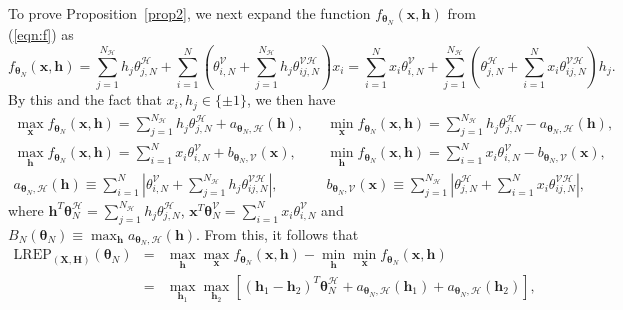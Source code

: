 \documentclass[12pt]{article}
\theoremstyle{definition}
\newcommand{\REP}{\mathrm{LREP}}
\newcommand{\Gam}{B_{N}(\boldsymbol \theta_N) }
\begin{document}
 To prove Proposition~\ref{prop2},
 we next expand the function $f_{\boldsymbol \theta_N} (\boldsymbol x, \boldsymbol h)$  from (\ref{eqn:f}) as
 \[
f_{\boldsymbol \theta_N} (\boldsymbol x, \boldsymbol h)= \sum_{j=1}^{N_\mathcal{H}} h_j \theta_{j,N}^{\mathcal{H}}  +   \sum_{i=1}^N \left( \theta_{i,N}^{\mathcal{V}} + \sum_{j=1}^{N_\mathcal{H}}  h_j  \theta_{ij,N}^{\mathcal{VH}}\right)x_i=\sum_{i=1}^N x_i  \theta_{i,N}^{\mathcal{V}} +  \sum_{j=1}^{N_\mathcal{H}} \left( \theta_{j,N}^{\mathcal{H}}  + \sum_{i=1}^N  x_i  \theta_{ij,N}^{\mathcal{VH}}\right)h_j.\]
By this and the fact that $x_i,h_j\in\{\pm 1\}$, we then have
\begin{eqnarray}
\nonumber \max_{\boldsymbol x}  f_{\boldsymbol \theta_N} (\boldsymbol x, \boldsymbol h) =  \sum_{j=1}^{N_\mathcal{H}} h_j \theta_{j,N}^{\mathcal{H}}  +   a_{\boldsymbol \theta_N, \mathcal{H}} (\boldsymbol h),   &&
 \min_{\boldsymbol x}  f_{\boldsymbol \theta_N} (\boldsymbol x, \boldsymbol h) =  \sum_{j=1}^{N_\mathcal{H}} h_j \theta_{j,N}^{\mathcal{H}}  -   a_{\boldsymbol \theta_N, \mathcal{H}} (\boldsymbol h),\\\nonumber
  \max_{\boldsymbol h}  f_{\boldsymbol \theta_N} (\boldsymbol x, \boldsymbol h) =   \sum_{i=1}^{N}x_i \theta_{i,N}^{\mathcal{V}}  +   b_{\boldsymbol \theta_N, \mathcal{V}} (\boldsymbol x),  &&
 \min_{\boldsymbol h}  f_{\boldsymbol \theta_N} (\boldsymbol x, \boldsymbol h) =  \sum_{i=1}^{N}x_i \theta_{i,N}^{\mathcal{V}}  -   b_{\boldsymbol \theta_N, \mathcal{V}} (\boldsymbol x),\\ \label{eqn:max}
  a_{\boldsymbol \theta_N, \mathcal{H}} (\boldsymbol h) \equiv \sum_{i=1}^N \left| \theta_{i,N}^{\mathcal{V}} + \sum_{j=1}^{N_\mathcal{H}}  h_j  \theta_{ij,N}^{\mathcal{VH}}\right|, &&  b_{\boldsymbol \theta_N, \mathcal{V}} (\boldsymbol x) \equiv \sum_{j=1}^{N_\mathcal{H}} \left| \theta_{j,N}^{\mathcal{H}}  + \sum_{i=1}^N  x_i  \theta_{ij,N}^{\mathcal{VH}}\right|,
\end{eqnarray}
where  $\boldsymbol h^T \boldsymbol \theta_N^{\mathcal{H}}=\sum_{j=1}^{N_\mathcal{H}} h_j \theta_{j,N}^{\mathcal{H}}$, $\boldsymbol x^T \boldsymbol \theta_N^{\mathcal{V}}=  \sum_{i=1}^{N}x_i \theta_{i,N}^{\mathcal{V}}$ and $\Gam\equiv \max_{\boldsymbol h} a_{\boldsymbol \theta_N, \mathcal{H}} (\boldsymbol h) $.
From this, it follows that
\begin{eqnarray*}
 \REP_{(\boldsymbol X, \boldsymbol H)}(\boldsymbol \theta_N) &=&  \max_{\boldsymbol h}\max_{\boldsymbol x}f_{\boldsymbol \theta_N} (\boldsymbol x , \boldsymbol h) -  \min_{\boldsymbol h}\min_{\boldsymbol x}f_{\boldsymbol \theta_N} (\boldsymbol x , \boldsymbol h)\\&=&
   \max_{\boldsymbol h_1 }  \max_{\boldsymbol h_2 }\left[ (\boldsymbol h_1 - \boldsymbol h_2)^T \boldsymbol \theta_N^{\mathcal{H}}  +   a_{\boldsymbol \theta_N, \mathcal{H}} (\boldsymbol h_1)  + a_{\boldsymbol \theta_N, \mathcal{H}} (\boldsymbol h_2)\right],
\end{eqnarray*}
\end{document}
